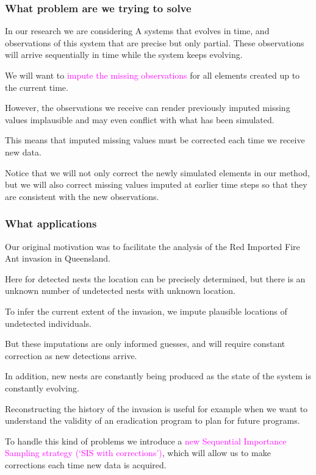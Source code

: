 \documentclass[9pt, xcolor={dvipsnames,svgnames,table}]{beamer}
\begin{document}
\begin{frame}
\frametitle{What problem are we trying to solve}
In our research we are considering A systems that evolves in time, and observations of this system that are precise but only partial. These observations will arrive sequentially in time while the system keeps evolving.

We will want to \textcolor{Fuchsia}{impute the missing observations} for all elements created up to the current time. 

However, the observations we receive can render previously imputed missing values implausible and may even conflict with what has been simulated.

This means that imputed missing values must be corrected each time we receive new data.

Notice that we will not only correct the newly simulated elements in our method, but we will also correct missing values imputed at earlier time steps so that they are consistent with the new observations.
 
\end{frame}






\begin{frame}
\frametitle{What applications}
Our original motivation was to facilitate the analysis of the Red Imported Fire Ant invasion in Queensland.

Here for detected nests the location can be precisely determined, but there is an unknown number of undetected nests with unknown location.

To infer the current extent of the invasion, we impute plausible locations of undetected individuals. 

But these imputations are only informed guesses, and will require constant correction as new detections arrive. 

In addition, new nests are constantly being produced as the state of the system is constantly evolving.

Reconstructing the history of the invasion is useful for example when we want to understand the validity of an eradication program to plan for future programs.

To handle this kind of problems we introduce a \textcolor{Fuchsia}{new Sequential Importance Sampling  strategy (`SIS with corrections')}, which will allow us to make corrections each time new data is acquired.
\end{frame}
\end{document}
